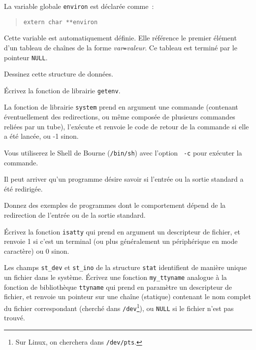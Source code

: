 %


% 


\question

La variable globale {\tt environ} est déclarée comme~:

\begin {quote}
    \verb|extern char **environ|
\end {quote}

Cette variable est automatiquement définie. Elle référence le premier
élément d'un tableau de chaînes de la forme {\em var{\tt=}valeur}. Ce
tableau est terminé par le pointeur {\tt NULL}.

Dessinez cette structure de données.

Écrivez la fonction de librairie {\tt getenv}.


\question

La fonction de librairie {\tt system} prend en argument une commande
(contenant éven\-tuel\-lement des redirections, ou même composée de
plusieurs commandes reliées par un tube), l'exécute et renvoie
le code de retour de la commande si elle a été lancée, ou -1
sinon.

Vous utiliserez le Shell de Bourne ({\tt /bin/sh}) avec l'option {\tt
-c} pour exécuter la commande.


\question

Il peut arriver qu'un programme désire savoir si l'entrée ou la
sortie standard a été redirigée.

Donnez des exemples de programmes dont le comportement dépend de la
redirection de l'entrée ou de la sortie standard.

Écrivez la fonction {\tt isatty} qui prend en argument un descripteur
de fichier, et renvoie 1 si c'est un terminal (ou plus généralement un
périphérique en mode caractère) ou 0 sinon.


\question

Les champs {\tt st\_dev} et {\tt st\_ino} de la structure {\tt stat}
identifient de manière unique un fichier dans le système. Écrivez
une fonction {\tt my\_ttyname} analogue à la fonction de bibliothèque
\texttt {ttyname} qui prend en paramètre un descripteur de fichier, et
renvoie un pointeur sur une chaîne (statique) contenant le nom complet
du fichier correspondant (cherché dans {\tt /dev}\footnote {Sur Linux,
on cherchera dans \texttt {/dev/pts}.}), ou \texttt {NULL} si le fichier
n'est pas trouvé.


